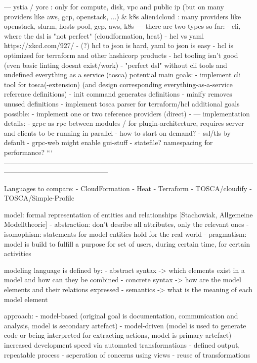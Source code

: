 ---
ystia / yorc : only for compute, disk, vpc and public ip (but on many providers like aws, gcp, openstack, ...) & k8s
alien4cloud : many providers like openstack, slurm, hosts pool, gcp, aws, k8s
---
there are two types so far:
- cli, where the dsl is "not perfect" (cloudformation, heat)
  - hcl vs yaml https://xkcd.com/927/
    - (?) hcl to json is hard, yaml to json is easy
    - hcl is optimized for terraform and other hashicorp products
    - hcl tooling isn't good (even basic linting doesnt exist/work)
- "perfect dsl" without cli tools and undefined everything as a service (tosca)
potential main goals:
- implement cli tool for tosca(-extension) (and design corresponding everything-as-a-service reference definitions)
  - init command generates definitions
  - minify removes unused definitions
- implement tosca parser for terraform/hcl
additional goals possible:
- implement one or two reference providers (direct)
- 
---
implementation details:
- grpc as rpc between modules / for plugin-architecture, requires server and clients to be running in parallel - how to start on demand?
  - ssl/tls by default
  - grpc-web might enable gui-stuff
- statefile? namespacing for performance?
```
---------------------------------------------------------------------------------------------------------------------------------------------------------


Languages to compare:
- CloudFormation
- Heat
- Terraform
- TOSCA/cloudify
- TOSCA/Simple-Profile

model: formal representation of entities and relationships [Stachowiak, Allgemeine Modelltheorie]
  - abstraction: don't desribe all attributes, only the relevant ones
  - isomophism: statements for model entities hold for the real world
  - pragmatism: model is build to fulfill a purpose for set of users, during certain time, for certain activities

modeling language is defined by:
- abstract syntax -> which elements exist in a model and how can they be combined
- concrete syntax -> how are the model elements and their relations expressed
- semantics -> what is the meaning of each model element

approach:
- model-based (original goal is documentation, communication and analysis, model is secondary artefact)
- model-driven (model is used to generate code or being interpreted for extracting actions, model is primary artefact)
  - increased development speed via automated transformations
  - defined output, repeatable process
  - seperation of concerns using views
  - reuse of transformations

